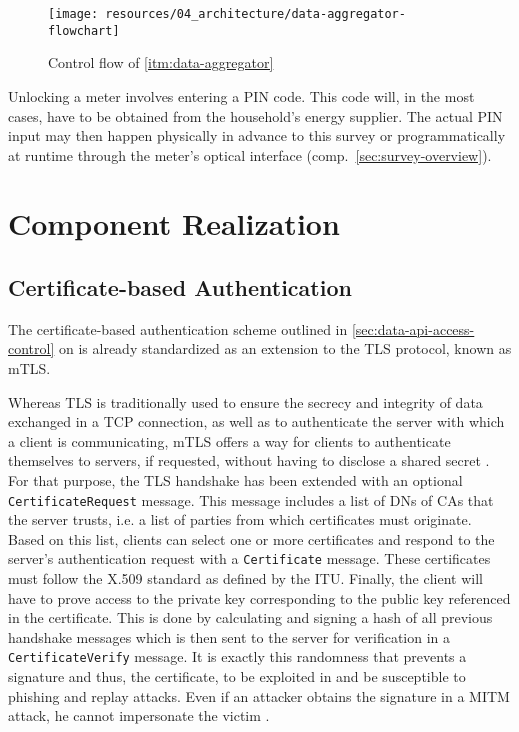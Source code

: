 \begin{figure}[hbt]
  \centering
  \texttt{[image: resources/04\_architecture/data-aggregator-flowchart]}
  \caption{Control flow of \ref{itm:data-aggregator}}
  \label{fig:data-aggregator-control-flow}
\end{figure}

\FloatBarrier

Unlocking a meter involves entering a \acs{PIN} code. This code will, in the most cases, have to be obtained from the household's energy supplier. The actual \acs{PIN} input may then happen physically in advance to this survey or programmatically at runtime through the meter's optical interface (comp.~\autoref{sec:survey-overview}).


\section{Component Realization}
\label{sec:component-realization}


\subsection{Certificate-based Authentication}
\label{sec:certificate-based-authentication}

The certificate-based authentication scheme outlined in \autoref{sec:data-api-access-control} on  is already standardized as an extension to the \acs{TLS} protocol, known as \ac{mTLS}.

Whereas \acs{TLS} is traditionally used to ensure the secrecy and integrity of data exchanged in a \acs{TCP} connection, as well as to authenticate the server with which a client is communicating, \acs{mTLS} offers a way for clients to authenticate themselves to servers, if requested, without having to disclose a shared secret \cite[p.~1]{parsovs2013practical}. For that purpose, the \acs{TLS} handshake has been extended with an optional \texttt{CertificateRequest} message. This message includes a list of \acp{DN} of \acp{CA} that the server trusts, i.e. a list of parties from which certificates must originate. Based on this list, clients can select one or more certificates and respond to the server's authentication request with a \texttt{Certificate} message. These certificates must follow the X.509 standard as defined by the \ac{ITU}. Finally, the client will have to prove access to the private key corresponding to the public key referenced in the certificate. This is done by calculating and signing a hash of all previous handshake messages which is then sent to the server for verification in a \texttt{CertificateVerify} message. It is exactly this randomness that prevents a signature and thus, the certificate, to be exploited in and be susceptible to phishing and replay attacks. Even if an attacker obtains the signature in a \acs{MITM} attack, he cannot impersonate the victim \cite[p.~2]{parsovs2013practical}.


